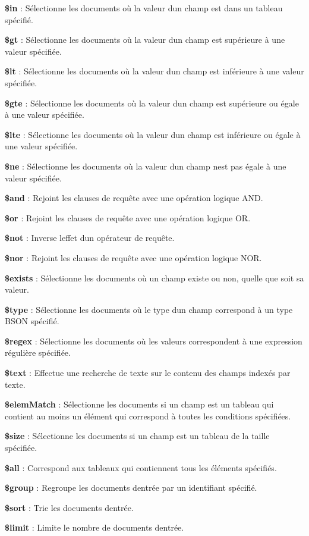 \begin{DoxyItemize}
\item {\bfseries \$in} \+: Sélectionne les documents où la valeur d\textquotesingle{}un champ est dans un tableau spécifié.
\item {\bfseries \$gt} \+: Sélectionne les documents où la valeur d\textquotesingle{}un champ est supérieure à une valeur spécifiée.
\item {\bfseries \$lt} \+: Sélectionne les documents où la valeur d\textquotesingle{}un champ est inférieure à une valeur spécifiée.
\item {\bfseries \$gte} \+: Sélectionne les documents où la valeur d\textquotesingle{}un champ est supérieure ou égale à une valeur spécifiée.
\item {\bfseries \$lte} \+: Sélectionne les documents où la valeur d\textquotesingle{}un champ est inférieure ou égale à une valeur spécifiée.
\item {\bfseries \$ne} \+: Sélectionne les documents où la valeur d\textquotesingle{}un champ n\textquotesingle{}est pas égale à une valeur spécifiée.
\item {\bfseries \$and} \+: Rejoint les clauses de requête avec une opération logique A\+ND.
\item {\bfseries \$or} \+: Rejoint les clauses de requête avec une opération logique OR.
\item {\bfseries \$not} \+: Inverse l\textquotesingle{}effet d\textquotesingle{}un opérateur de requête.
\item {\bfseries \$nor} \+: Rejoint les clauses de requête avec une opération logique N\+OR.
\item {\bfseries \$exists} \+: Sélectionne les documents où un champ existe ou non, quelle que soit sa valeur.
\item {\bfseries \$type} \+: Sélectionne les documents où le type d\textquotesingle{}un champ correspond à un type B\+S\+ON spécifié.
\item {\bfseries \$regex} \+: Sélectionne les documents où les valeurs correspondent à une expression régulière spécifiée.
\item {\bfseries \$text} \+: Effectue une recherche de texte sur le contenu des champs indexés par texte.
\item {\bfseries \$elem\+Match} \+: Sélectionne les documents si un champ est un tableau qui contient au moins un élément qui correspond à toutes les conditions spécifiées.
\item {\bfseries \$size} \+: Sélectionne les documents si un champ est un tableau de la taille spécifiée.
\item {\bfseries \$all} \+: Correspond aux tableaux qui contiennent tous les éléments spécifiés.
\item {\bfseries \$group} \+: Regroupe les documents d\textquotesingle{}entrée par un identifiant spécifié.
\item {\bfseries \$sort} \+: Trie les documents d\textquotesingle{}entrée.
\item {\bfseries \$limit} \+: Limite le nombre de documents d\textquotesingle{}entrée.
\end{DoxyItemize}

